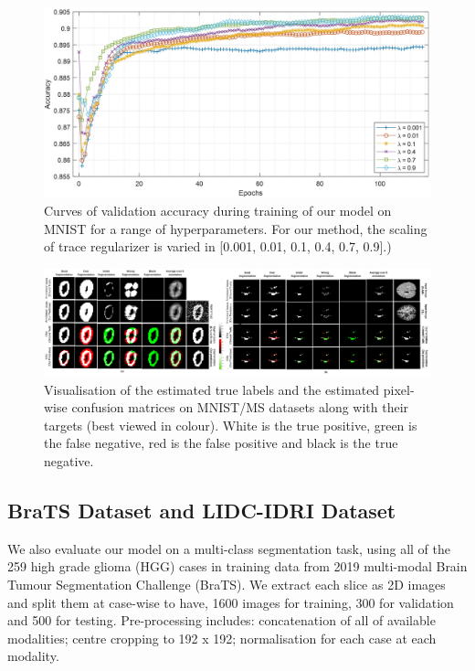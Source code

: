 \begin{figure}[t!]
        \center
        \includegraphics[width=\linewidth]{chapter_8_neurips/picture4.jpg}
        \caption{Curves of validation accuracy during training of our model on MNIST for a range of hyperparameters. For our method, the scaling of trace regularizer is varied in [0.001, 0.01, 0.1, 0.4, 0.7, 0.9].)}
        \label{Paramater lambda}
\end{figure}
    

\begin{figure}[t!]
    \centering
    \includegraphics[width=\linewidth]{chapter_8_neurips/picture7.jpg}
    \caption{\footnotesize Visualisation of the estimated true labels and the estimated pixel-wise confusion matrices on MNIST/MS datasets along with their targets (best viewed in colour). White is the true positive, green is the false negative, red is the false positive and black is the true negative.}
    \label{CMs of MNIST and MS}
\end{figure}

\clearpage
\subsection{BraTS Dataset and LIDC-IDRI Dataset}
We also evaluate our model on a multi-class segmentation task, using all of the 259 high grade glioma (HGG) cases in training data from 2019 multi-modal Brain Tumour Segmentation Challenge (BraTS). We extract each slice as 2D images and split them at case-wise to have, 1600 images for training, 300 for validation and 500 for testing. Pre-processing includes: concatenation of all of available modalities; centre cropping to 192 x 192; normalisation for each case at each modality. 

